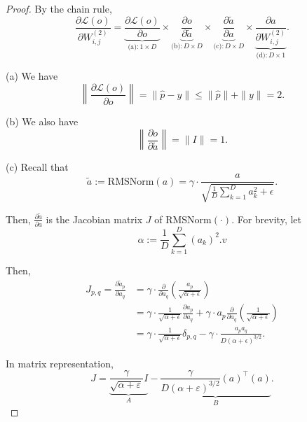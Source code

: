 \documentclass{article}
\begin{document}
\begin{proof}
By the chain rule,
\begin{equation}
\frac{\partial \mathcal{L}(o)}{\partial W_{i,j}^{(2)}} = 
    \underbrace{\frac{\partial \mathcal{L}(o)}{\partial o}}_{\text{(a)}: 1 \times D} \times 
    \underbrace{\frac{\partial o}{\partial \tilde{a}}}_{\text{(b)}: D \times D} \times 
    \underbrace{\frac{\partial \tilde{a}}{\partial a}}_{\text{(c)}: D \times D} \times 
    \underbrace{\frac{\partial a}{\partial W_{i,j}^{(2)}}}_{\text{(d)}: D \times 1}.    
\end{equation}


(a) We have
\begin{equation}
    \left\| \frac{\partial \mathcal{L}(o)}{\partial o} \right\| = \| \hat{p} - y \| \leq \| \hat{p} \| + \| y \| = 2.    
\end{equation}

(b) We also have
\begin{equation}
    \left\| \frac{\partial o}{\partial \tilde{a}} \right\| = \| I \| = 1.
\end{equation}


(c) Recall that
\begin{equation}
    \tilde{a} := \mathrm{RMSNorm}(a) = \gamma \cdot \frac{a}{\sqrt{\frac{1}{D} \sum_{k=1}^D a_{k}^2 + \epsilon}}.    
\end{equation}

Then, $\frac{\partial \tilde{a}}{\partial a}$ is the Jacobian matrix $J$ of $\mathrm{RMSNorm}(\cdot)$. For brevity, let
\begin{equation}
    \alpha := \frac{1}{D} \sum_{k=1}^D (a_{k})^2.
v\end{equation}

Then,
\begin{align}
J_{p,q} = \frac{\partial \tilde{a}_{p}}{\partial a_{q}} 
&= \gamma \cdot \frac{\partial}{\partial a_{q}} \left( \frac{a_{p}}{\sqrt{\alpha + \epsilon}} \right) \\
&= \gamma \cdot \frac{1}{\sqrt{\alpha + \epsilon}} \frac{\partial a_{p}}{\partial a_{q}} 
+ \gamma \cdot a_{p} \frac{\partial}{\partial a_{q}} \left( \frac{1}{\sqrt{\alpha + \epsilon}} \right) \\
&= \gamma \cdot \frac{1}{\sqrt{\alpha + \epsilon}} \delta_{p,q} 
- \gamma \cdot \frac{a_{p} a_{q}}{D (\alpha + \epsilon)^{3/2}}.
\end{align}

In matrix representation,
\begin{equation}
    J = \underbrace{\frac{\gamma}{\sqrt{\alpha + \varepsilon}} I}_{A} 
    - \underbrace{\frac{\gamma}{D(\alpha + \varepsilon)^{3/2}} \left(a\right)^\top \left(a\right)}_{B}.
\end{equation}


\end{proof}
\end{document}
